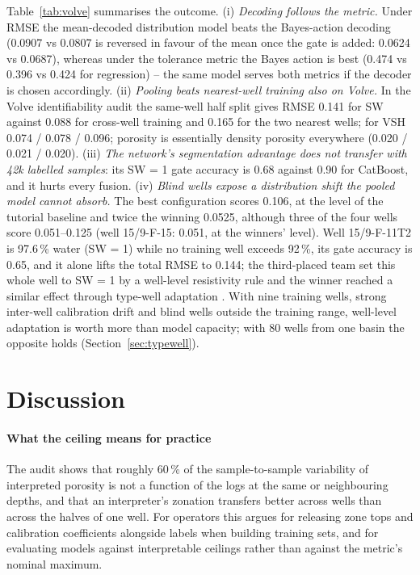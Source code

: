 \documentclass[preprint,12pt]{elsarticle}
\begin{document}
Table~\ref{tab:volve} summarises the outcome. (i) \emph{Decoding follows the metric.} Under RMSE the mean-decoded distribution model beats the Bayes-action decoding (0.0907 vs 0.0807 is reversed in favour of the mean once the gate is added: 0.0624 vs 0.0687), whereas under the tolerance metric the Bayes action is best (0.474 vs 0.396 vs 0.424 for regression) -- the same model serves both metrics if the decoder is chosen accordingly. (ii) \emph{Pooling beats nearest-well training also on Volve.} In the Volve identifiability audit the same-well half split gives RMSE 0.141 for SW against 0.088 for cross-well training and 0.165 for the two nearest wells; for VSH 0.074 / 0.078 / 0.096; porosity is essentially density porosity everywhere (0.020 / 0.021 / 0.020). (iii) \emph{The network's segmentation advantage does not transfer with 42k labelled samples}: its SW = 1 gate accuracy is 0.68 against 0.90 for CatBoost, and it hurts every fusion. (iv) \emph{Blind wells expose a distribution shift the pooled model cannot absorb.} The best configuration scores 0.106, at the level of the tutorial baseline and twice the winning 0.0525, although three of the four wells score 0.051--0.125 (well 15/9-F-15: 0.051, at the winners' level). Well 15/9-F-11T2 is 97.6\,\% water (SW = 1) while no training well exceeds 92\,\%, its gate accuracy is 0.65, and it alone lifts the total RMSE to 0.144; the third-placed team set this whole well to SW = 1 by a well-level resistivity rule and the winner reached a similar effect through type-well adaptation \cite{fu2024contest}. With nine training wells, strong inter-well calibration drift and blind wells outside the training range, well-level adaptation is worth more than model capacity; with 80 wells from one basin the opposite holds (Section~\ref{sec:typewell}).

\section{Discussion}
\label{sec:discussion}

\paragraph{What the ceiling means for practice} The audit shows that roughly 60\,\% of the sample-to-sample variability of interpreted porosity is not a function of the logs at the same or neighbouring depths, and that an interpreter's zonation transfers better across wells than across the halves of one well. For operators this argues for releasing zone tops and calibration coefficients alongside labels when building training sets, and for evaluating models against interpretable ceilings rather than against the metric's nominal maximum.
\end{document}
